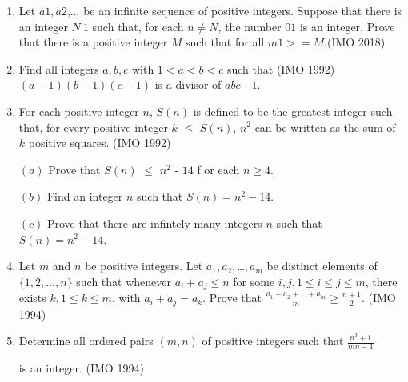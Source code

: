 \begin{enumerate}
		\item Let $a1,a2$,... be an infinite sequence of positive integers. Suppose that there is an integer $N\>1$ such that, for each $n\neq N$, the number $01$ is an integer. Prove that there is a positive integer $M$ such that for all $m1>=M$.\hfill (IMO 2018)
 \item  Find all integers $a,b,c$ with $1 < a < b <c$ such that  \hfill(IMO 1992)                                        
 $(a-1)(b-1)(c-1)$ is a divisor of $abc$ - $1$.
\item For each positive integer $n$, $S(n)$ is defined to be the greatest integer such that, for every positive integer $k$ $\leq$ $S(n)$, $n^{2}$ can be  written as the sum of $k$ positive squares.  \hfill(IMO 1992)       

$(a)$ Prove that $S(n)$ $\leq$ $n^{2}$ - $14$ f    or each $n \geq 4$.                                 

$(b)$ Find an integer $n$ such that $S(n)=n^{2}    -14$.                                               

$(c)$ Prove that there are infintely many integers $n$ such that $S(n) = {n^{2}}-14$.
\item Let $m$ and $n$ be positive integers. Let $a_1, a_2, $\dots$ , a_m$ be distinct elements of $\{1, 2, \dots , n\}$ such that whenever $a_i + a_j \leq n$ for some $i, j, 1 \leq i \leq j \leq m$, there exists $k, 1 \leq k \leq m$, with $a_i + a_j = a_k$. Prove that
	$\frac{a_1+a_2+\dots+a_m}{m} \geq \frac{n+1}{2}$.        \hfill(IMO 1994)
\item Determine all ordered pairs $(m,n)$ of positive integers such that                               
  $\frac{{n^{3}}+1}{mn-1}$
                                                
		 is an integer.  \hfill(IMO 1994)
\end{enumerate}
